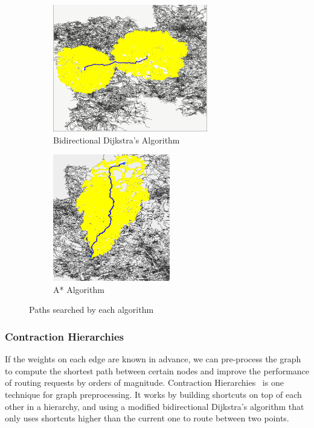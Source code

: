 \documentclass[ %
                    author={Alexander Hill},
                supervisor={Dr. Benjamin Sach},
                    degree={MEng},
                     title={MARMOSET},
                  subtitle={Multi-Agent Route Management using Online Simulation for Efficient Transportation},
                      type={research},
                      year={2016} ]{dissertation}
\begin{document}
\begin{figure}[h]
\centering
\begin{subfigure}[b]{0.4\textwidth}
    \centering
    \includegraphics[height=15em]{bidijkstra-city}
    \caption{Bidirectional Dijkstra's Algorithm}\label{fig:bidijkstra}
\end{subfigure}
\hspace{2em}
\begin{subfigure}[b]{0.4\textwidth}
    \centering
    \includegraphics[height=15em]{astar-city}
    \caption{A* Algorithm}\label{fig:astar}
\end{subfigure}
\caption{Paths searched by each algorithm}
\end{figure}

\subsubsection{Contraction Hierarchies}

If the weights on each edge are known in advance, we can pre-process the graph to
compute the shortest path between certain nodes and improve the
performance of routing requests by orders of magnitude. Contraction
Hierarchies~\cite{ch} is one technique for graph preprocessing.  It works by
building shortcuts on top of each other in a hierarchy, and using a modified
bidirectional Dijkstra's algorithm that only uses shortcuts higher than the
current one to route between two points.
\end{document}
